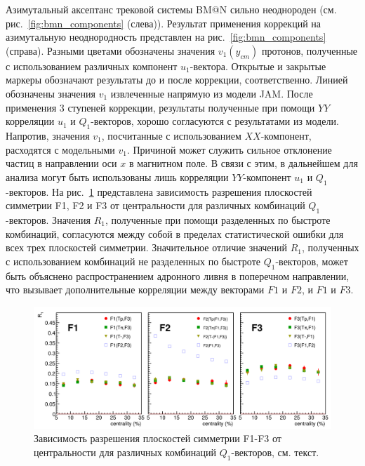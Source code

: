 Азимутальный аксептанс трековой системы BM@N сильно неоднороден (см. рис.~\ref{fig:bmn_components} (слева)).
Результат  применения коррекций на азимутальную неоднородность представлен на рис.~\ref{fig:bmn_components} (справа).
Разными цветами обозначены значения $v_1(y_{cm})$ протонов, полученные с использованием различных компонент $u_1$-вектора. 
Открытые и закрытые маркеры обозначают результаты до и после коррекции, соответственно.
Линией обозначены значения $v_1$  извлеченные напрямую из модели JAM.
После применения 3 ступеней коррекции, результаты полученные при помощи $YY$ корреляции $u_1$ и $Q_1$-векторов, хорошо согласуются с результатами из модели.
Напротив, значения $v_1$, посчитанные с использованием $XX$-компонент, расходятся с модельными  $v_1$. 
Причиной может служить сильное отклонение частиц в направлении оси $x$ в магнитном поле. 
В связи с этим, в дальнейшем для анализа могут быть использованы лишь корреляции $YY$-компонент $u_1$ и $Q_1$-векторов.
На рис.~\ref{fig:bmn_combinations} представлена зависимость разрешения плоскостей симметрии F1, F2 и F3 от центральности для различных комбинаций $Q_1$-векторов.
Значения $R_1$, полученные при помощи разделенных по быстроте комбинаций, согласуются между собой в пределах статистической ошибки для всех трех плоскостей симметрии. 
Значительное отличие значений $R_1$, полученных с использованием комбинаций не разделенных по быстроте $Q_1$-векторов, может быть объяснено распространением адронного ливня в поперечном направлении, что вызывает дополнительные корреляции между векторами $F1$ и $F2$, и $F1$ и $F3$.
%
\begin{figure}[h]
\begin{center}
\includegraphics[width=0.87\linewidth]{images/R1_F123_combinations_centrality.png}
\caption{Зависимость разрешения плоскостей симметрии F1-F3 от центральности для различных комбинаций $Q_1$-векторов, см. текст.}
\label{fig:bmn_combinations}
\end{center}
\end{figure}

